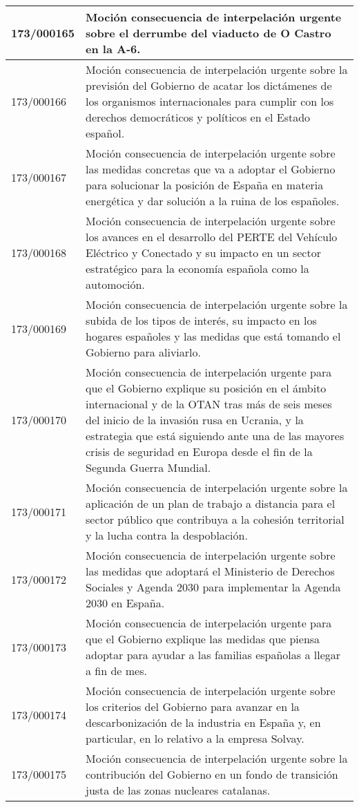 {\begin{table}[H]
\begin{center}
\begin{tabularx}{\linewidth}{| l | X |}
\hline
173/000165 & Moción consecuencia de interpelación urgente sobre el derrumbe del viaducto de O Castro en la A-6. \\
\hline
173/000166 & Moción consecuencia de interpelación urgente sobre la previsión del Gobierno de acatar los dictámenes de los organismos internacionales para cumplir con los derechos democráticos y políticos en el Estado español. \\
\hline
173/000167 & Moción consecuencia de interpelación urgente sobre las medidas concretas que va a adoptar el Gobierno para solucionar la posición de España en materia energética y dar solución a la ruina de los españoles. \\
\hline
173/000168 & Moción consecuencia de interpelación urgente sobre los avances en el desarrollo del PERTE del Vehículo Eléctrico y Conectado y su impacto en un sector estratégico para la economía española como la automoción. \\
\hline
173/000169 & Moción consecuencia de interpelación urgente sobre la subida de los tipos de interés, su impacto en los hogares españoles y las medidas que está tomando el Gobierno para aliviarlo. \\
\hline
173/000170 & Moción consecuencia de interpelación urgente para que el Gobierno explique su posición en el ámbito internacional y de la OTAN tras más de seis meses del inicio de la invasión rusa en Ucrania, y la estrategia que está siguiendo ante una de las mayores crisis de seguridad en Europa desde el fin de la Segunda Guerra Mundial. \\
\hline
173/000171 & Moción consecuencia de interpelación urgente sobre la aplicación de un plan de trabajo a distancia para el sector público que contribuya a la cohesión territorial y la lucha contra la despoblación. \\
\hline
173/000172 & Moción consecuencia de interpelación urgente sobre las medidas que adoptará el Ministerio de Derechos Sociales y Agenda 2030 para implementar la Agenda 2030 en España. \\
\hline
173/000173 & Moción consecuencia de interpelación urgente para que el Gobierno explique las medidas que piensa adoptar para ayudar a las familias españolas a llegar a fin de mes. \\
\hline
173/000174 & Moción consecuencia de interpelación urgente sobre los criterios del Gobierno para avanzar en la descarbonización de la industria en España y, en particular, en lo relativo a la empresa Solvay. \\
\hline
173/000175 & Moción consecuencia de interpelación urgente sobre la contribución del Gobierno en un fondo de transición justa de las zonas nucleares catalanas. \\

\end{tabularx}
\end{center}
\end{table}}
